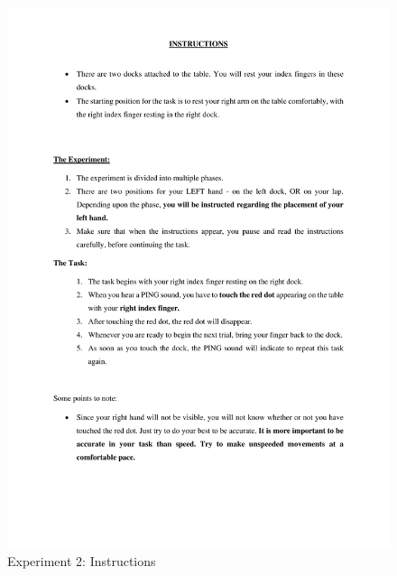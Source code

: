 \begin{figure}[h!]
\centering       
    \includegraphics[width=\textwidth, keepaspectratio]{Images/admin/Exp2- Instructions-1.png}
    \caption{Experiment 2: Instructions}
    \label{}
\end{figure}


